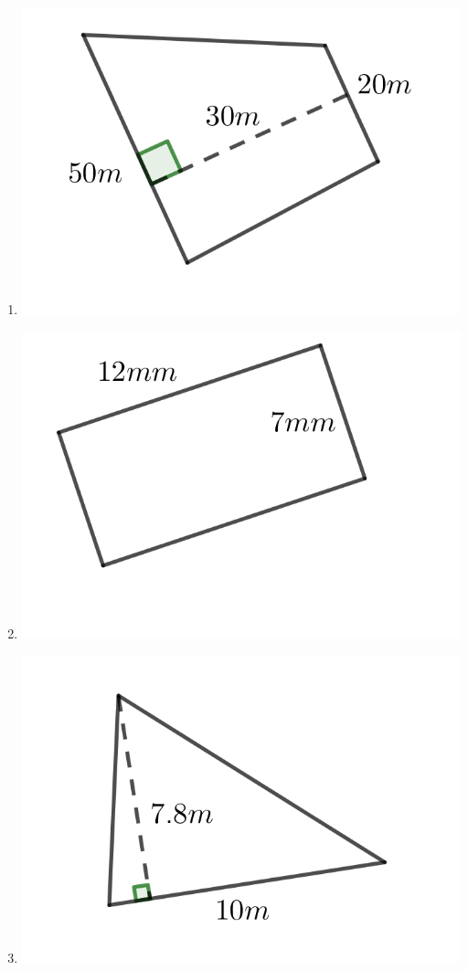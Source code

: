 \begin{multicols}{2}
\begin{enumerate}
	\item \includegraphics{./Images/Measurement/AreaQu4.png}
	\item \includegraphics{./Images/Measurement/AreaQu5.png}
	\item \includegraphics{./Images/Measurement/AreaQu6.png}

\end{enumerate}
\end{multicols}
